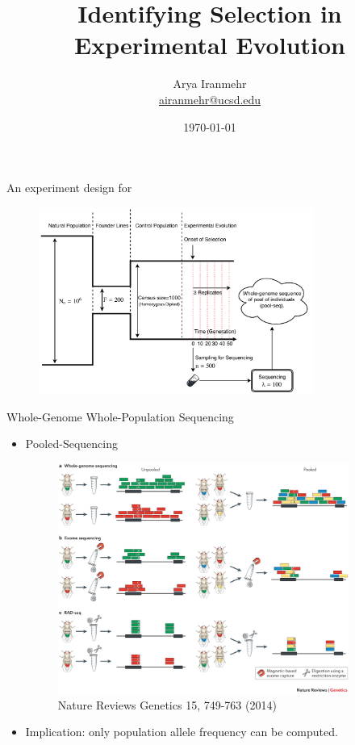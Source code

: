 \documentclass[t]{beamer} %
\title{Identifying Selection in Experimental Evolution}
\subtitle{}
\author[Arya Iranmehr]
{%
  \texorpdfstring{
      \centering
      Arya Iranmehr\\
      \href{mailto:airanmehr@ucsd.edu}{airanmehr@ucsd.edu}
  }
  {Arya Iranmehr}
}
\institute{
Bafna Lab\\
University of California, San Diego}
\date{
\monthyeardate\today}
\begin{document}
\begin{frame}
  \titlepage
\end{frame}




\begin{frame}{An experiment design for \dmel}
	\begin{figure}
		\includegraphics[trim={0.8in 0.0in 0.0in 
			0in},clip,width=0.8\textwidth]{../figures/ExperimentalEvolution}
	\end{figure}
\end{frame}

\begin{frame}{Whole-Genome Whole-Population Sequencing}
	\begin{itemize}
		\item Pooled-Sequencing 
		\begin{figure}
			\includegraphics[trim={.05in 7.5in 0.0in 
				0in},clip,width=0.9\textwidth]{../figures/pool-seq}\\
			\tiny{Nature Reviews Genetics 15, 749-763 (2014)}
		\end{figure}
		\pause
			\item Implication: only population allele frequency can be computed.
	\end{itemize}	
\end{frame}
\end{document}
